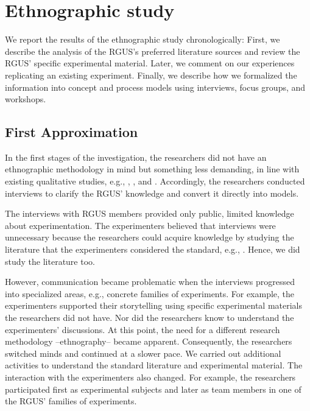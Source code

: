 \section{Ethnographic study}\label{sec-reseach-execution}
We report the results of the ethnographic study chronologically: First, we describe the analysis of the RGUS's preferred literature sources and review the RGUS' specific experimental material. Later, we comment on our experiences replicating an existing experiment. Finally, we describe how we formalized the information into concept and process models using interviews, focus groups, and workshops.

\subsection{First Approximation}
In the first stages of the investigation, the researchers did not have an ethnographic methodology in mind but something less demanding, in line with existing qualitative studies, e.g., \cite{Johanssen-2019-Continuous-SE-support}, \cite{Strandberg-2019-Ethical-Interviews-SE}, and \cite{Yang-2021-interview-study-developers}. Accordingly, the researchers conducted interviews to clarify the RGUS' knowledge and convert it directly into models. 

The interviews with RGUS members provided only public, limited knowledge about experimentation. The experimenters believed that interviews were unnecessary because the researchers could acquire knowledge by studying the literature that the experimenters considered the standard, e.g., \cite{Wohlin-2000-Experimentation-SE}. Hence, we did study the literature too.

However, communication became problematic when the interviews progressed into specialized areas, e.g., concrete families of experiments. For example, the experimenters supported their storytelling using specific experimental materials the researchers did not have. Nor did the researchers know to understand the experimenters' discussions. At this point, the need for a different research methodology --ethnography-- became apparent. Consequently, the researchers switched minds and continued at a slower pace. We carried out additional activities to understand the standard literature and experimental material. The interaction with the experimenters also changed. For example, the researchers participated first as experimental subjects and later as team members in one of the RGUS' families of experiments.

